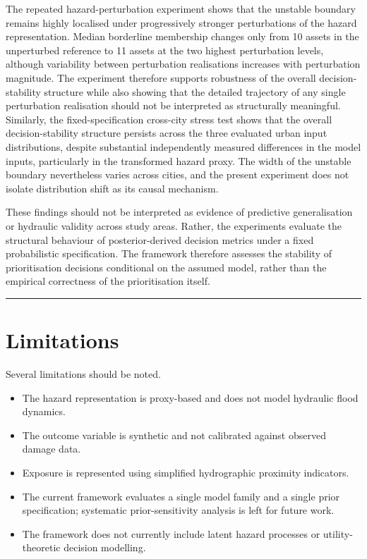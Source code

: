 \documentclass[
]{article}
\providecommand{\tightlist}{%
  \setlength{\itemsep}{0pt}\setlength{\parskip}{0pt}}
\begin{document}
The repeated hazard-perturbation experiment shows that the unstable
boundary remains highly localised under progressively stronger
perturbations of the hazard representation. Median borderline membership
changes only from 10 assets in the unperturbed reference to 11 assets at
the two highest perturbation levels, although variability between
perturbation realisations increases with perturbation magnitude. The
experiment therefore supports robustness of the overall
decision-stability structure while also showing that the detailed
trajectory of any single perturbation realisation should not be
interpreted as structurally meaningful. Similarly, the
fixed-specification cross-city stress test shows that the overall
decision-stability structure persists across the three evaluated urban
input distributions, despite substantial independently measured
differences in the model inputs, particularly in the transformed hazard
proxy. The width of the unstable boundary nevertheless varies across
cities, and the present experiment does not isolate distribution shift
as its causal mechanism.

These findings should not be interpreted as evidence of predictive
generalisation or hydraulic validity across study areas. Rather, the
experiments evaluate the structural behaviour of posterior-derived
decision metrics under a fixed probabilistic specification. The
framework therefore assesses the stability of prioritisation decisions
conditional on the assumed model, rather than the empirical correctness
of the prioritisation itself.

\begin{center}\rule{0.5\linewidth}{0.5pt}\end{center}

\section{Limitations}\label{limitations}

Several limitations should be noted.

\begin{itemize}
\tightlist
\item
  The hazard representation is proxy-based and does not model hydraulic
  flood dynamics.
\item
  The outcome variable is synthetic and not calibrated against observed
  damage data.
\item
  Exposure is represented using simplified hydrographic proximity
  indicators.
\item
  The current framework evaluates a single model family and a single
  prior specification; systematic prior-sensitivity analysis is left for
  future work.
\item
  The framework does not currently include latent hazard processes or
  utility-theoretic decision modelling.
\end{itemize}
\end{document}
